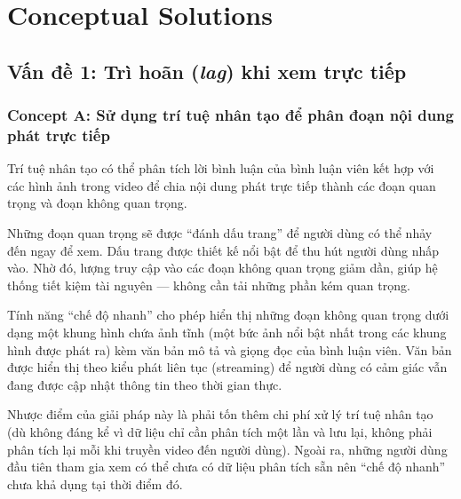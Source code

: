 %
\section{Conceptual Solutions}

\subsection{Vấn đề 1: Trì hoãn (\textit{lag}) khi xem trực tiếp}

\subsubsection{Concept A: Sử dụng trí tuệ nhân tạo để phân đoạn nội dung phát trực tiếp}

Trí tuệ nhân tạo có thể phân tích lời bình luận của bình luận viên kết hợp với các hình ảnh trong video để chia nội dung phát trực tiếp thành các đoạn quan trọng và đoạn không quan trọng.

Những đoạn quan trọng sẽ được ``đánh dấu trang'' để người dùng có thể nhảy đến ngay để xem. Dấu trang được thiết kế nổi bật để thu hút người dùng nhấp vào. Nhờ đó, lượng truy cập vào các đoạn không quan trọng giảm dần, giúp hệ thống tiết kiệm tài nguyên — không cần tải những phần kém quan trọng.

Tính năng ``chế độ nhanh'' cho phép hiển thị những đoạn không quan trọng dưới dạng một khung hình chứa ảnh tĩnh (một bức ảnh nổi bật nhất trong các khung hình được phát ra) kèm văn bản mô tả và giọng đọc của bình luận viên. Văn bản được hiển thị theo kiểu phát liên tục (streaming) để người dùng có cảm giác vẫn đang được cập nhật thông tin theo thời gian thực.

Nhược điểm của giải pháp này là phải tốn thêm chi phí xử lý trí tuệ nhân tạo (dù không đáng kể vì dữ liệu chỉ cần phân tích một lần và lưu lại, không phải phân tích lại mỗi khi truyền video đến người dùng). Ngoài ra, những người dùng đầu tiên tham gia xem có thể chưa có dữ liệu phân tích sẵn nên ``chế độ nhanh'' chưa khả dụng tại thời điểm đó.


